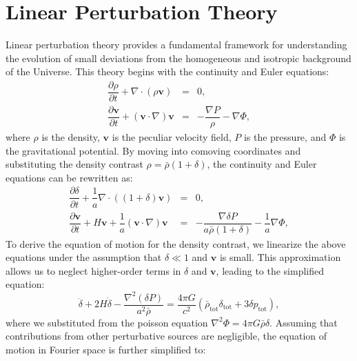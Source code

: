 \section{Linear Perturbation Theory}
Linear perturbation theory provides a fundamental framework for understanding the evolution of small deviations from the homogeneous and isotropic background of the Universe. This theory begins with the continuity and Euler equations:
\begin{eqnarray}
    \label{eq:continuity_equation}
    \dfrac{\partial \rho}{\partial t} + \nabla \cdot (\rho \boldsymbol{v}) &=& 0, \\[2ex]
    \label{eq:euler_equation}
    \dfrac{\partial \boldsymbol{v}}{\partial t} + (\boldsymbol{v} \cdot \nabla) \boldsymbol{v} &=& -\dfrac{\nabla P}{\rho} - \nabla \Phi,
\end{eqnarray}
where \( \rho \) is the density, \( \boldsymbol{v} \) is the peculiar velocity field, \( P \) is the pressure, and \( \Phi \) is the gravitational potential.
By moving into comoving coordinates and substituting the density contrast $\rho = \bar{\rho}(1 + \delta)$, the continuity and Euler equations can be rewritten as:
\begin{eqnarray}
    \label{eq:continuity_equation_rewritten}
    \dfrac{\partial \delta}{\partial t} + \dfrac{1}{a} \nabla \cdot ((1 + \delta) \boldsymbol{v}) &=& 0, \\[2ex]
    \label{eq:euler_equation_rewritten}
    \dfrac{\partial \boldsymbol{v}}{\partial t} + H \boldsymbol{v} + \dfrac{1}{a} (\boldsymbol{v} \cdot \nabla) \boldsymbol{v} &=& -\dfrac{\nabla \delta P}{a \bar{\rho} (1 + \delta)} - \dfrac{1}{a} \nabla \Phi,
\end{eqnarray}
To derive the equation of motion for the density contrast, we linearize the above equations under the assumption that \( \delta \ll 1 \) and \( \boldsymbol{v} \) is small. This approximation allows us to neglect higher-order terms in \( \delta \) and \( \boldsymbol{v} \), leading to the simplified equation:
\begin{equation}
    \ddot{\delta} + 2H\dot{\delta} - \frac{\nabla^2 (\delta P)}{a^2 \bar{\rho}} = \frac{4\pi G}{c^2} \left( \bar{\rho}_\mathrm{tot} \delta_\mathrm{tot} + 3 \delta p_\mathrm{tot} \right),
\end{equation}
where we substituted from the poisson equation \( \nabla^2 \Phi = 4\pi G \bar{\rho} \delta \).
Assuming that contributions from other perturbative sources are negligible, the equation of motion in Fourier space is further simplified to:
